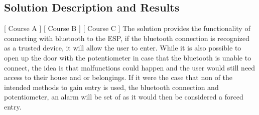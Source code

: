 \subsection{Solution Description and Results}
[ Course A ] [ Course B ] [ Course C ] 
\newline
The solution provides the functionality of connecting with bluetooth to the ESP, if the bluetooth connection is recognized as a trusted device, it will allow the user to enter. While it is also possible to open up the door with the potentiometer in case that the bluetooth is unable to connect, the idea is that malfunctions could happen and the user would still need access to their house and or belongings. If it were the case that non of the intended methods to gain entry is used, the bluetooth connection and potentiometer, an alarm will be set of as it would then be considered a forced entry.